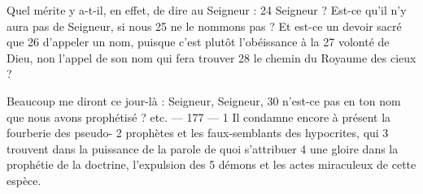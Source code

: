 Quel mérite y a-t-il, en effet, de dire au Seigneur :	 
24	 	Seigneur ? Est-ce qu'il n'y aura pas de Seigneur, si nous	 
25	 	ne le nommons pas ? Et est-ce un devoir sacré que	 
26	 	d'appeler un nom, puisque c'est plutôt l'obéissance à la	 
27	 	volonté de Dieu, non l'appel de son nom qui fera trouver	 
28	 	le chemin du Royaume des cieux ?

Beaucoup me diront ce jour-là : Seigneur, Seigneur,	 
30	 	n'est-ce pas en ton nom que nous avons prophétisé ? etc.	 
 	--- 177 ---	 
1	 	Il condamne encore à présent la fourberie des pseudo-	 
2	 	prophètes et les faux-semblants des hypocrites, qui	 
3	 	trouvent dans la puissance de la parole de quoi s'attribuer	 
4	 	une gloire dans la prophétie de la doctrine, l'expulsion des	 
5	 	démons et les actes miraculeux de cette espèce.

